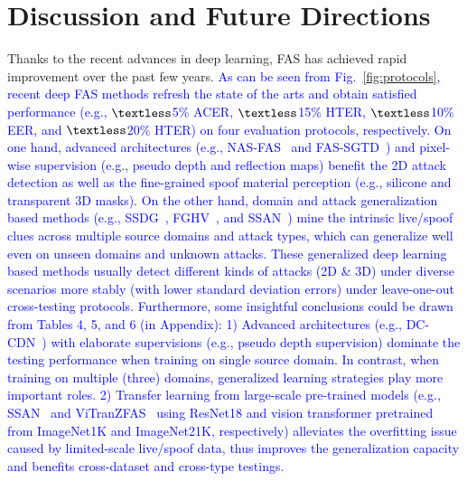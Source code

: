 \documentclass[10pt,journal,compsoc]{IEEEtran}
\begin{document}
\section{Discussion and Future Directions} \label{sec:discussion}

Thanks to the recent advances in deep learning, FAS has achieved rapid improvement over the past few years. \textcolor{blue}{As can be seen from Fig.~\ref{fig:protocols}, recent deep FAS methods refresh the state of the arts and obtain satisfied performance (e.g., $\textless$5\% ACER, $\textless$15\% HTER, $\textless$10\% EER, and $\textless$20\% HTER) on four evaluation protocols, respectively. On one hand, advanced architectures (e.g., NAS-FAS~\cite{yu2020fas2} and FAS-SGTD~\cite{wang2020deep}) and pixel-wise supervision (e.g., pseudo depth and reflection maps) benefit the 2D attack detection as well as the fine-grained spoof material perception (e.g., silicone and transparent 3D masks). On the other hand, domain and attack generalization based methods (e.g., SSDG~\cite{jia2020single}, FGHV~\cite{liu2022feature}, and SSAN~\cite{wang2022domain}) mine the intrinsic live/spoof clues across multiple source domains and attack types, which can generalize well even on unseen domains and unknown attacks. These generalized deep learning based methods usually detect different kinds of attacks (2D \& 3D) under diverse scenarios more stably (with lower standard deviation errors) under leave-one-out cross-testing protocols. Furthermore, some insightful conclusions could be drawn from Tables 4, 5, and 6 (in Appendix): 1) Advanced architectures (e.g., DC-CDN~\cite{yu2021dual}) with elaborate supervisions (e.g., pseudo depth supervision) dominate the testing performance when training on single source domain. In contrast, when training on multiple (three) domains, generalized learning strategies play more important roles. 2) Transfer learning from large-scale pre-trained models (e.g., SSAN~\cite{wang2022domain} and ViTranZFAS~\cite{liu2019deep} using ResNet18 and vision transformer pretrained from ImageNet1K and ImageNet21K, respectively) alleviates the overfitting issue caused by limited-scale live/spoof data, thus improves the generalization capacity and benefits cross-dataset and cross-type testings.} 
\end{document}
